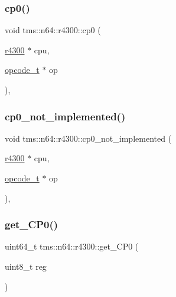 \mbox{\label{classtms_1_1n64_1_1r4300_aec7f322861a51255230c9f5e16cd0ac1}} 
\subsubsection{\texorpdfstring{cp0()}{cp0()}}
{\footnotesize\ttfamily void tms\+::n64\+::r4300\+::cp0 (\begin{DoxyParamCaption}\item[{\hyperlink{classtms_1_1n64_1_1r4300}{r4300} $\ast$}]{cpu,  }\item[{\hyperlink{classtms_1_1n64_1_1opcode__t}{opcode\+\_\+t} $\ast$}]{op }\end{DoxyParamCaption})\hspace{0.3cm}{\ttfamily [static]}, {\ttfamily [private]}}

\mbox{\label{classtms_1_1n64_1_1r4300_ab3ede218c63b9a1c60ff82217a500b8e}} 
\subsubsection{\texorpdfstring{cp0\+\_\+not\+\_\+implemented()}{cp0\_not\_implemented()}}
{\footnotesize\ttfamily void tms\+::n64\+::r4300\+::cp0\+\_\+not\+\_\+implemented (\begin{DoxyParamCaption}\item[{\hyperlink{classtms_1_1n64_1_1r4300}{r4300} $\ast$}]{cpu,  }\item[{\hyperlink{classtms_1_1n64_1_1opcode__t}{opcode\+\_\+t} $\ast$}]{op }\end{DoxyParamCaption})\hspace{0.3cm}{\ttfamily [static]}, {\ttfamily [private]}}

\mbox{\label{classtms_1_1n64_1_1r4300_a2e873d36829bed45630c8bf02b3a676c}} 
\subsubsection{\texorpdfstring{get\+\_\+\+C\+P0()}{get\_CP0()}}
{\footnotesize\ttfamily uint64\+\_\+t tms\+::n64\+::r4300\+::get\+\_\+\+C\+P0 (\begin{DoxyParamCaption}\item[{uint8\+\_\+t}]{reg }\end{DoxyParamCaption})}

